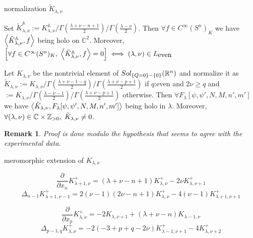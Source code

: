 \documentclass[8pt]{beamer}
\theoremstyle{mystyle}
\newtheorem*{remark}{Remark}
\begin{document}
\begin{frame}{normalization $\tilde{K}_{ \lambda,\nu }$}
\begin{theorem}
	Set $\tilde{K}^{\mathbb{ A }}_{ \lambda,\nu }:={{K}^{\mathbb{ A }}_{ \lambda,\nu }}/\Gamma(\frac{ \lambda+\nu-n+1 }{2})/
	\Gamma(\frac{ \lambda-\nu }{ 2 })$. Then $\forall f\in C^{ \infty }(S^n)_K$ we have $
	\left<\tilde{K}^{\mathbb{ A }}_{ \lambda,\nu },f\right>$ being holo on $\mathbb{ C }^2$. Moreover, $\left[\forall f\in C^{ \infty }(S^n)
	_K,\;\left<\tilde{K}^{\mathbb{ A }}_{ \lambda,\nu },f\right>=0\right]\iff (\lambda,\nu)\in L_{ \mbox{even} }$
\end{theorem}
\begin{theorem}[$O(p+1,q+1),\;n:=p+q$]
	Let $K_{ \lambda,\nu }$ be the nontrivial element of $Sol_{\left\{Q=0\right\}-\left\{0\right\}}(\mathbb{R}^n)$
	and normalize it as $\tilde{ K }_{ \lambda,\nu }
	:=K_{ \lambda,\nu }/\Gamma(\frac{ \lambda+\nu-1-q }{ 2 })/\Gamma(\frac{ \lambda+ \nu-p+1}{ 2 })$
	if $q$:even and $2\nu\geq q$ and 
	$:=K_{ \lambda,\nu }/\Gamma(\frac{ \lambda-\nu-1 }{ 2 })/\Gamma(\frac{ \lambda+ \nu-p+1}{ 2 })$ otherwise.
	Then $\forall F_\lambda[\psi,\psi',N,M,n',m']$ we have $\left< \tilde{ K }_{ \lambda,\nu }, F_\lambda[\psi,\psi',N,M,n',m']\right>
	$ being holo in $\lambda$. Moreover, $\forall (\lambda,\nu)\in\mathbb{C}\times\mathbb{ Z }_{ >0 },\;\tilde{ K }_{ \lambda,\nu }\neq0$.
\end{theorem}
\begin{remark}
	Proof is done modulo the hypothesis %
	that seems to agree with the experimental data.
\end{remark}
\end{frame}
\begin{frame}{meromorphic extension of ${K}_{ \lambda,\nu }$}
\begin{theorem}
	\[\frac{ \partial }{ \partial x_n }K^+_{ \lambda+1,\nu }=(\lambda+\nu-n+1)K^+_{ \lambda,\nu }-2\nu K^+_{ \lambda,\nu +1}\]
	\[\Delta_{ n-1 }K^+_{ \lambda+1,\nu-1 }=2(\nu-1)(2\nu-n+1)K^+_{ \lambda,\nu }-4(\nu-1)K^+_{\lambda+1,\nu+1  }\]
\end{theorem}
\begin{theorem}[$O(p+1,q+1),\;n:=(p)+(q)$]
	\[\frac{ \partial }{ \partial x_p }K^+_{ \lambda,\nu }=-2K_{ \lambda,\nu+1 }+(\lambda+\nu-n)K_{ \lambda-1,\nu }\]
	\[\Delta_{ p-1,q }K^+_{ \lambda,\nu }=-2(-3+p+q-2\nu) K^+_{ \lambda-1,\nu+1 }-4K^+_{ \lambda,\nu+2 }\]
\end{theorem}
\end{frame}
\end{document}
